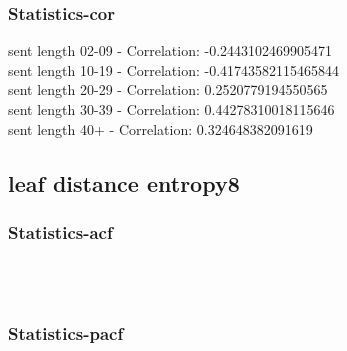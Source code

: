\documentclass{article}%
\begin{document}
%
\newpage%
\subsubsection{Statistics{-}cor}%
\label{ssubsec:Statistics{-}cor}%
\noindent%
sent length 02-09 - Correlation: -0.2443102469905471\\%
sent length 10-19 - Correlation: -0.41743582115465844\\%
sent length 20-29 - Correlation: 0.2520779194550565\\%
sent length 30-39 - Correlation: 0.44278310018115646\\%
sent length 40+ - Correlation: 0.324648382091619\\

%
\newpage

%
\subsection{leaf distance entropy8}%
\label{subsec:leafdistanceentropy8}%
\subsubsection{Statistics{-}acf}%
\label{ssubsec:Statistics{-}acf}%


\begin{figure}[ht]%
\centering%
\setlength{\abovecaptionskip}{-35pt}%
%
%
\\%
%
%
\\%
%
\end{figure}

%
\newpage%
\subsubsection{Statistics{-}pacf}%
\label{ssubsec:Statistics{-}pacf}%
\end{document}
